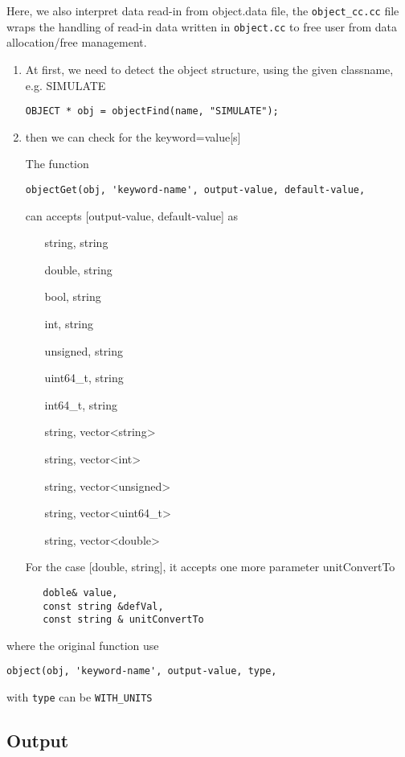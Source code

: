 Here, we also interpret data read-in from object.data file, the
\verb!object_cc.cc! file wraps the handling of read-in data written in
\verb!object.cc! to free user from data allocation/free management.
\begin{enumerate}
  \item At first, we need to detect the object structure, using the given
  classname, e.g. SIMULATE
\begin{verbatim}
OBJECT * obj = objectFind(name, "SIMULATE");
\end{verbatim}
  \item then we can check for the keyword=value[s]
  
The function
\begin{verbatim}
objectGet(obj, 'keyword-name', output-value, default-value, 
\end{verbatim}
can accepts [output-value, default-value] as
\begin{itemize}
  \item [string, string]
  \item [double, string]
  \item [bool, string]
  \item [int, string]
  \item [unsigned, string]
  \item [uint64\_t, string]
  \item [int64\_t, string]
  \item [string, vector<string>]
  \item [string, vector<int>]
  \item [string, vector<unsigned>]
  \item [string, vector<uint64\_t>]
  \item [string, vector<double>]
\end{itemize}

For the case [double, string], it accepts one more parameter unitConvertTo 
\begin{verbatim}
   doble& value,
   const string &defVal,
   const string & unitConvertTo
\end{verbatim}

\end{enumerate}

where the original function use
\begin{verbatim}
object(obj, 'keyword-name', output-value, type, 
\end{verbatim}
with \verb!type! can be \verb!WITH_UNITS!

\subsection{Output}

